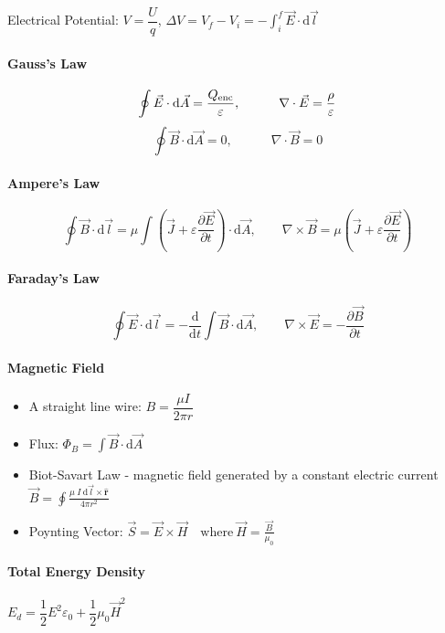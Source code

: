 \documentclass[a4paper, 11pt]{article}
\begin{document}
Electrical Potential: $V = \dfrac{U}{q}$, \quad $\displaystyle \Delta V = V_{f}-V_{i} = -\int_{i}^{f} \vec{E} \cdot \mathrm{d} \vec{l}$

\paragraph{Gauss's Law}
\[
    \oint \vec{E} \cdot \mathrm{d}\vec{A} = \frac{Q_{\rm enc}}{\varepsilon}, 
    \quad \quad \quad 
    \nabla \cdot \vec{E} = \frac{\rho}{\varepsilon}
\]
\[
    \oint \vec{B} \cdot \mathrm{d}\vec{A} = 0, 
    \quad \quad \quad 
    \nabla \cdot \vec{B} = 0
\]


\paragraph{Ampere's Law}
\[
    \oint \vec{B} \cdot \mathrm{d}\vec{l} = \mu \int \left( \vec{J}+\varepsilon \frac{\partial \vec{E}}{\partial t} \right) \cdot \mathrm{d}\vec{A},
    \quad \quad
    \nabla \times \vec{B} = \mu \left( \vec{J}+\varepsilon \frac{\partial \vec{E}}{\partial t} \right)
\]


\paragraph{Faraday's Law}
\[
    \oint \vec{E} \cdot \mathrm{d}\vec{l} = -\frac{\mathrm{d}}{\mathrm{d}t} \int\vec{B} \cdot \mathrm{d}\vec{A},
    \quad \quad
    \nabla 
    \times \vec{E} = - \frac{\partial \vec{B}}{\partial t}
\]


\paragraph{Magnetic Field}
\begin{itemize}
    \item A straight line wire: $B = \dfrac{\mu I}{2 \pi r}$
    \item Flux: $\Phi_{B} = \int\vec{B} \cdot \mathrm{d}\vec{A}$
    \item Biot-Savart Law - magnetic field generated by a constant electric current $\displaystyle \vec{B} = \oint\frac{\mu \ I \ \mathrm{d}\vec{l}\times \hat{\boldsymbol{r}}}{4 \pi r^{2}}$
    \item Poynting Vector: $\displaystyle \vec{S} = \vec{E}\times \vec{H}\quad \text{where} \ \vec{H}=\frac{\vec{B}}{\mu_{0}}$
\end{itemize}


\paragraph{Total Energy Density} $E_{d}=\dfrac{1}{2}E^{2} \varepsilon_0 
 + \dfrac{1}{2}\mu_0 \vec{H}^{2}$
\end{document}

